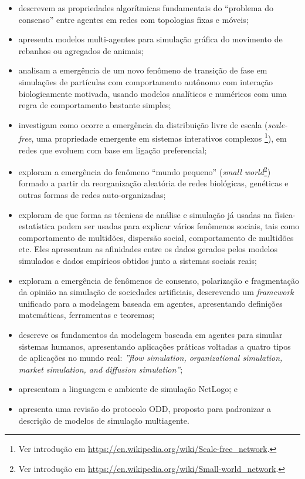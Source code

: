 \begin{itemize}
    \item  \cite{olfati-saber_consensus_2004} descrevem as propriedades algorítmicas fundamentais do ``problema do consenso'' entre agentes em redes com topologias fixas e móveis;
    \item  \cite{reynolds_flocks_1987} apresenta modelos multi-agentes para simulação gráfica do movimento de rebanhos ou agregados de animais;
    \item \cite{vicsek_novel_1995} analisam a emergência de um novo fenômeno de transição de fase em simulações de partículas com comportamento autônomo com interação biologicamente motivada, usando modelos analíticos e numéricos com uma regra de comportamento bastante simples;
    \item \cite{barabasi_emergence_1999} investigam como ocorre a emergência da distribuição livre de escala (\textit{scale-free}, uma  propriedade emergente em sistemas interativos complexos \footnote{Ver introdução em \url{https://en.wikipedia.org/wiki/Scale-free_network}.}), em redes que evoluem com base em ligação preferencial;
    \item \cite{watts_collective_1998} exploram a emergência do fenômeno ``mundo pequeno'' (\textit{small world}\footnote{Ver introdução em \url{https://en.wikipedia.org/wiki/Small-world_network}.}) formado a partir da reorganização aleatória de redes biológicas, genéticas e outras formas de redes auto-organizadas;
    \item \cite{castellano_statistical_2009} exploram de que forma as técnicas de análise e simulação já usadas na física-estatística podem ser usadas para explicar vários fenômenos sociais, tais como comportamento de multidões, dispersão social, comportamento de multidões etc. Eles apresentam as afinidades entre os dados gerados pelos modelos simulados e dados empíricos obtidos junto a sistemas sociais reais;
    \item \cite{hegselmann_opinion_2002} exploram a emergência de fenômenos de consenso, polarização e fragmentação da opinião na simulação de sociedades artificiais, descrevendo um \textit{framework} unificado para a modelagem baseada em agentes, apresentando definições matemáticas, ferramentas e teoremas;
    \item \cite{bonabeau_agent-based_2002} descreve os fundamentos da modelagem baseada em agentes para simular sistemas humanos, apresentando aplicações práticas voltadas a quatro tipos de aplicações no mundo real: \textit{''flow simulation, organizational simulation, market simulation, and diffusion simulation''};
    \item \cite{wilensky_netlogo_1999} apresentam a linguagem e ambiente de simulação NetLogo; e
    \item \cite{grimm_odd_2010} apresenta uma revisão do protocolo ODD, proposto para padronizar a descrição de modelos de simulação multiagente.
\end{itemize}

